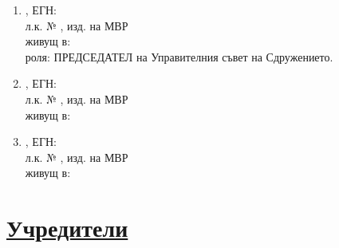 \documentclass[11pt,a4paper]{article}
\newlength{\itemvspace}
\begin{document}
\vspace{0.7cm}

\begin{enumerate}
\item \makebox[10cm]{\dotfill}, ЕГН: \dotfill \\[\itemvspace]
  л.к. № \makebox[5cm]{\dotfill}, изд. на \makebox[4cm]{\dotfill} МВР \dotfill \\[\itemvspace]
  живущ в: \dotfill \\[\itemvspace]
  роля: ПРЕДСЕДАТЕЛ на Управителния съвет на Сдружението. \\[\itemvspace]
\item \makebox[10cm]{\dotfill}, ЕГН: \dotfill \\[\itemvspace]
  л.к. № \makebox[5cm]{\dotfill}, изд. на \makebox[4cm]{\dotfill} МВР \dotfill \\[\itemvspace]
  живущ в: \dotfill \\[\itemvspace]
\item \makebox[10cm]{\dotfill}, ЕГН: \dotfill \\[\itemvspace]
  л.к. № \makebox[5cm]{\dotfill}, изд. на \makebox[4cm]{\dotfill} МВР \dotfill \\[\itemvspace]
  живущ в: \dotfill \\[\itemvspace]
\end{enumerate}

\newpage

\section*{\uline{Учредители}}\label{sec:founders}

\vspace{0.7cm}
\end{document}
